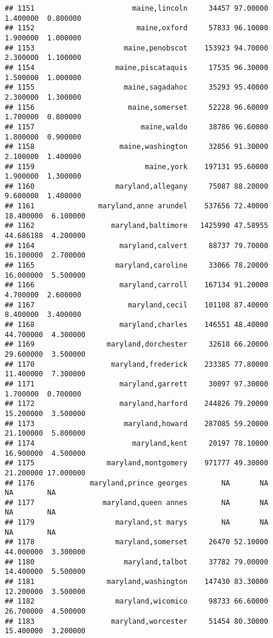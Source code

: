 \documentclass[
]{article}
\begin{document}
\begin{verbatim}
## 1151                       maine,lincoln     34457 97.00000  1.400000  0.800000
## 1152                        maine,oxford     57833 96.10000  1.900000  1.000000
## 1153                     maine,penobscot    153923 94.70000  2.300000  1.100000
## 1154                   maine,piscataquis     17535 96.30000  1.500000  1.000000
## 1155                     maine,sagadahoc     35293 95.40000  2.300000  1.300000
## 1156                      maine,somerset     52228 96.60000  1.700000  0.800000
## 1157                         maine,waldo     38786 96.60000  1.800000  0.900000
## 1158                    maine,washington     32856 91.30000  2.100000  1.400000
## 1159                          maine,york    197131 95.60000  1.900000  1.300000
## 1160                   maryland,allegany     75087 88.20000  9.600000  1.400000
## 1161               maryland,anne arundel    537656 72.40000 18.400000  6.100000
## 1162                  maryland,baltimore   1425990 47.58955 44.686188  4.200000
## 1164                    maryland,calvert     88737 79.70000 16.100000  2.700000
## 1165                   maryland,caroline     33066 78.20000 16.000000  5.500000
## 1166                    maryland,carroll    167134 91.20000  4.700000  2.600000
## 1167                      maryland,cecil    101108 87.40000  8.400000  3.400000
## 1168                    maryland,charles    146551 48.40000 44.700000  4.300000
## 1169                 maryland,dorchester     32618 66.20000 29.600000  3.500000
## 1170                  maryland,frederick    233385 77.80000 11.400000  7.300000
## 1171                    maryland,garrett     30097 97.30000  1.700000  0.700000
## 1172                    maryland,harford    244826 79.20000 15.200000  3.500000
## 1173                     maryland,howard    287085 59.20000 21.100000  5.800000
## 1174                       maryland,kent     20197 78.10000 16.900000  4.500000
## 1175                 maryland,montgomery    971777 49.30000 21.200000 17.000000
## 1176             maryland,prince georges        NA       NA        NA        NA
## 1177                maryland,queen annes        NA       NA        NA        NA
## 1179                   maryland,st marys        NA       NA        NA        NA
## 1178                   maryland,somerset     26470 52.10000 44.000000  3.300000
## 1180                     maryland,talbot     37782 79.00000 14.400000  5.500000
## 1181                 maryland,washington    147430 83.30000 12.200000  3.500000
## 1182                   maryland,wicomico     98733 66.60000 26.700000  4.500000
## 1183                  maryland,worcester     51454 80.30000 15.400000  3.200000

\end{verbatim}
\end{document}
